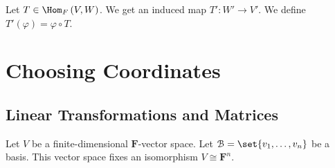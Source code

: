 \documentclass[10pt]{mypackage}
\begin{document}
\begin{definition}
  Let $T\in \Hom_{F}\left(V,W\right)$. We get an induced map $T': W'\rightarrow V'$. We define $T'\left(\varphi\right) = \varphi\circ T$.
  \begin{center}
  \end{center}
\end{definition}
\section{Choosing Coordinates}%
\subsection{Linear Transformations and Matrices}%
Let $V$ be a finite-dimensional $\mathbf{F}$-vector space. Let $\mathcal{B} = \set{v_1,\dots,v_n}$ be a basis. This vector space fixes an isomorphism $V \cong \mathbf{F}^n$.\newline
\end{document}
